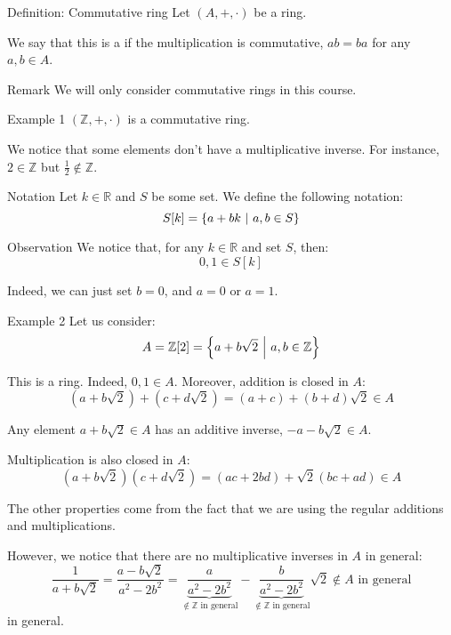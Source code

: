 \documentclass[a4paper]{article}
\begin{document}
\begin{parag}{Definition: Commutative ring}
    Let $\left(A, +, \cdot \right)$ be a ring.

    We say that this is a  if the multiplication is commutative, $ab = ba$ for any $a, b \in A$.

    \begin{subparag}{Remark}
        We will only consider commutative rings in this course.
    \end{subparag}
\end{parag}


\begin{parag}{Example 1}
    $\left(\mathbb{Z}, +, \cdot \right)$ is a commutative ring.

    We notice that some elements don't have a multiplicative inverse. For instance, $2 \in \mathbb{Z}$ but $\frac{1}{2} \not \in \mathbb{Z}$.
\end{parag}

\begin{parag}{Notation}
    Let $k \in \mathbb{R}$ and $S$ be some set. We define the following notation: 
    \[S \left[k\right] = \left\{a + b k \suchthat a, b \in S\right\}\]
    
    \begin{subparag}{Observation}
        We notice that, for any $k \in \mathbb{R}$ and set $S$, then:
        \[0, 1 \in S\left[k\right]\]

        Indeed, we can just set $b = 0$, and $a = 0$ or $a = 1$.
    \end{subparag}
\end{parag}


\begin{parag}{Example 2}
    Let us consider: 
    \[A = \mathbb{Z} \left[2\right] = \left\{a + b \sqrt{2} \suchthat a, b \in \mathbb{Z}\right\}\]
    
    This is a ring. Indeed, $0, 1 \in A$. Moreover, addition is closed in $A$: 
    \[\left(a + b\sqrt{2}\right) + \left(c + d\sqrt{2}\right) = \left(a+c\right) + \left(b+d\right)\sqrt{2} \in A\]

    Any element $a + b\sqrt{2} \in A$ has an additive inverse, $-a - b\sqrt{2} \in A$.

    Multiplication is also closed in $A$: 
    \[\left(a + b\sqrt{2}\right)\left(c + d\sqrt{2}\right) = \left(ac + 2bd\right) + \sqrt{2}\left(bc + ad\right) \in A\]
    
    The other properties come from the fact that we are using the regular additions and multiplications.

    However, we notice that there are no multiplicative inverses in $A$ in general: 
    \[\frac{1}{a + b\sqrt{2}} = \frac{a - b\sqrt{2}}{a^2 - 2b^2} = \underbrace{\frac{a}{a^2 - 2b^2}}_{\not \in \mathbb{Z} \text{ in general}} - \underbrace{\frac{b}{a^2 - 2b^2}}_{\not\in\mathbb{Z} \text{ in general}}\sqrt{2} \not \in A \text{ in general}\]
    in general.
\end{parag}
\end{document}

